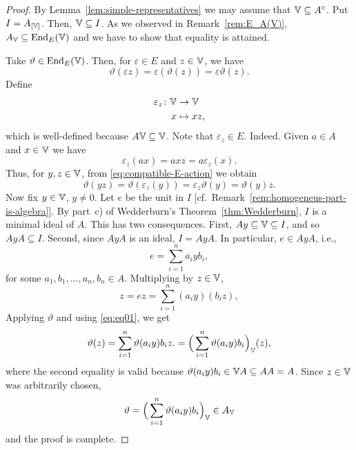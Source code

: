 \begin{proof}
    By Lemma~\ref{lem:simple-representatives} we may assume that $\mathbb V\subseteq A^\circ$. Put $I=A_{[\mathbb V]}$. Then, $\mathbb V\subseteq I$. As we observed in Remark~\ref{rem:E_A(V)}, $A_\mathbb V\subseteq {\operatorname{End}}_E(\mathbb V)$ and we have to show that equality is attained.

    Take $\vartheta\in {\operatorname{End}}_E(\mathbb V)$. Then, for $\varepsilon\in E$ and $z\in \mathbb V$, we have
    \begin{equation}\label{eq:compatible-E-action}
        \vartheta(\varepsilon z)=\varepsilon(\vartheta(z))=\varepsilon\vartheta(z).
    \end{equation}
    Define
    \begin{align*}
        \varepsilon_z\colon \mathbb V&\to \mathbb V\\
        x&\mapsto xz,
    \end{align*}
    which is well-defined because $A\mathbb V\subseteq \mathbb V$. Note that $\varepsilon_z\in E$. Indeed. Given $a\in A$ and $x\in \mathbb V$ we have
    $$
        \varepsilon_z(ax) = axz = a\varepsilon_z(x).
    $$
    Thus, for $y,z\in \mathbb V$, from \eqref{eq:compatible-E-action} we obtain
    \begin{equation}\label{eq:eq01}
        \vartheta(yz) = \vartheta(\varepsilon_{z}(y))
            = \varepsilon_{z}\vartheta(y)=\vartheta(y)z.
    \end{equation}
    Now fix $y\in \mathbb V$, $y\ne0$. Let $e$ be the unit in $I$ [cf.~Remark~\ref{rem:homogeneus-part-is-algebra}]. By part~c) of Wedderburn's Theorem~\ref{thm:Wedderburn}, $I$ is a minimal ideal of $A$. This has two consequences. First, $Ay\subseteq \mathbb V\subseteq I$, and so $AyA\subseteq I$. Second, since $AyA$ is an ideal, $I=AyA$. In particular, $e\in AyA$, i.e.,
    $$
        e = \sum_{i=1}^n a_iyb_i,
    $$
    for some $a_1,b_1,\dots,a_n,b_n\in A$. Multiplying by $z\in \mathbb V$,
    $$
        z=ez = \sum_{i=1}^n (a_iy)(b_iz),
    $$
    Applying $\vartheta$ and using \eqref{eq:eq01}, we get
    $$
        \vartheta(z)
        = \sum_{i=1}^n\vartheta(a_iy)b_iz.
        = \Big(\sum_{i=1}^n\vartheta(a_iy)b_i\Big)_\mathbb V(z),
    $$
    where the second equality is valid because $\vartheta(a_iy)b_i\in \mathbb V A\subseteq AA=A$. Since $z\in \mathbb V$ was arbitrarily chosen,
    $$
        \vartheta = \Big(\sum_{i=1}^n\vartheta(a_iy)b_i\Big)_\mathbb V \in A_\mathbb V
    $$
    and the proof is complete.
\end{proof}


